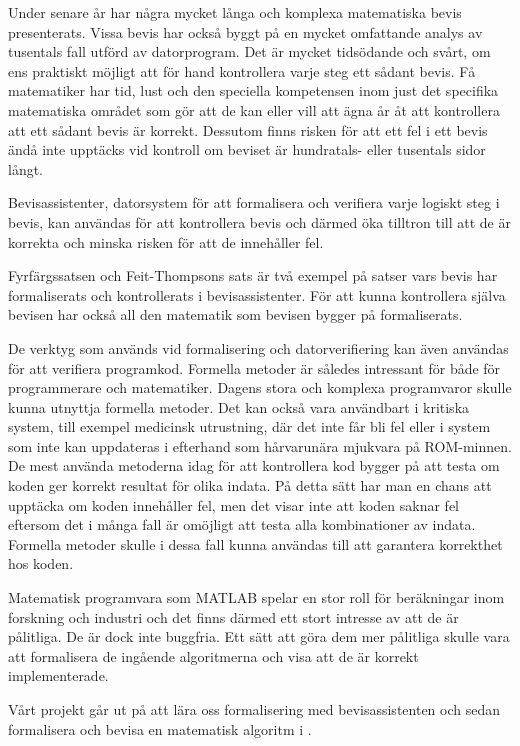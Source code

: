 Under senare år har några mycket långa och komplexa matematiska bevis
presenterats. Vissa bevis har också byggt på en mycket omfattande analys av
tusentals fall utförd av datorprogram. Det är mycket tidsödande och svårt, om
ens praktiskt möjligt att för hand kontrollera varje steg ett sådant bevis. Få
matematiker har tid, lust och den speciella kompetensen inom just det specifika
matematiska området som gör att de kan eller vill att ägna år åt att
kontrollera att ett sådant bevis är korrekt. Dessutom finns risken för att ett
fel i ett bevis ändå inte upptäcks vid kontroll om beviset är hundratals- eller
tusentals sidor långt.\cite{harrison2008formal}

Bevisassistenter, datorsystem för att formalisera och verifiera varje logiskt
steg i bevis, kan användas för att kontrollera bevis och därmed öka tilltron
till att de är korrekta och minska risken för att de innehåller fel.

Fyrfärgssatsen\cite{gonthier2008formal} och Feit-Thompsons
sats\cite{aschbacher2004status} är två exempel på satser vars bevis har
formaliserats och kontrollerats i bevisassistenter. För att kunna kontrollera
själva bevisen har också all den matematik som bevisen bygger på formaliserats.

De verktyg som används vid formalisering och datorverifiering kan även användas
för att verifiera programkod. Formella metoder är således intressant för både
för programmerare och matematiker.
Dagens stora och komplexa programvaror skulle kunna utnyttja formella metoder.
Det kan också vara användbart i
kritiska system, till exempel medicinsk utrustning,  där det inte får bli fel
eller i system som inte kan uppdateras i efterhand som hårvarunära mjukvara
på ROM-minnen. De mest använda metoderna idag för
att kontrollera kod bygger på att testa om koden ger korrekt resultat för olika
indata. På detta sätt har man en chans att upptäcka om koden innehåller fel,
men det visar inte att koden saknar fel eftersom det i många fall är omöjligt
att testa alla kombinationer av indata.
Formella metoder skulle i dessa fall
kunna användas till att garantera korrekthet hos koden.

Matematisk programvara som MATLAB spelar en stor roll för beräkningar inom
forskning och industri och det finns därmed ett stort intresse av att de är
pålitliga. De är dock inte buggfria. Ett sätt att göra dem mer pålitliga skulle
vara att formalisera de ingående algoritmerna och visa att de är korrekt
implementerade.\cite{mortberg2012}

Vårt projekt går ut på att lära oss formalisering med bevisassistenten \coq och
sedan formalisera och bevisa en matematisk algoritm i \coq.
